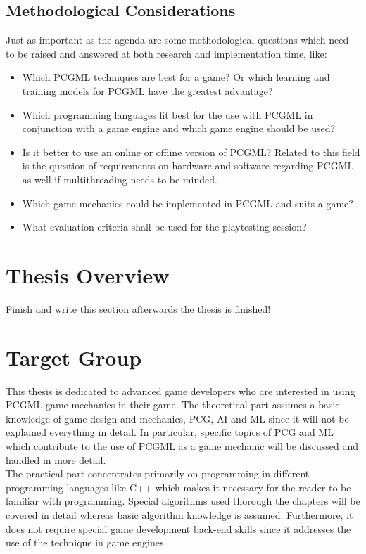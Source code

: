 \documentclass[MGS,Master,english]{twbook}%
\begin{document}
\subsection{Methodological Considerations}
Just as important as the agenda are some methodological questions which need to be raised and answered at both research and implementation time, like:
\begin{itemize}
	\item Which \ac{PCGML} techniques are best for a game? Or which learning and training models for \ac{PCGML} have the greatest advantage?
	\item Which programming languages fit best for the use with \ac{PCGML} in conjunction with a game engine and which game engine should be used? 
	\item Is it better to use an online or offline version of \ac{PCGML}? Related to this field is the question of requirements on hardware and software regarding \ac{PCGML} as well if multithreading needs to be minded.
	\item Which game mechanics could be implemented in \ac{PCGML} and suits a game?
	\item What evaluation criteria shall be used for the playtesting session?
\end{itemize} 


\section{Thesis Overview}
Finish and write this section afterwards the thesis is finished!

\section{Target Group}
This thesis is dedicated to advanced game developers who are interested in using PCGML game mechanics in their game. The theoretical part assumes a basic knowledge of game design and mechanics, PCG, \ac{AI} and ML since it will not be explained everything in detail. In particular, specific topics of PCG and ML which contribute to the use of PCGML as a game mechanic will be discussed and handled in more detail.\\
The practical part concentrates primarily on programming in different programming languages like C++ which makes it necessary for the reader to be familiar with programming. Special algorithms used thorough the chapters will be covered in detail whereas basic algorithm knowledge is assumed. Furthermore, it does not require special game development back-end skills since it addresses the use of the technique in game engines.
\end{document}
